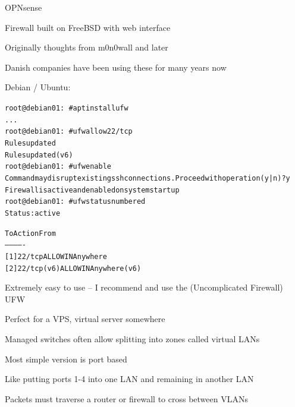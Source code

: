 \documentclass[Screen16to9,17pt]{foils}
\begin{document}


\begin{list2}
\item OPNsense 
\item Firewall built on FreeBSD with web interface
\item Originally thoughts from m0n0wall and later \\
\item Danish companies have been using these for many years now
\end{list2}



Debian / Ubuntu:
\begin{alltt}\scriptsize
root@debian01:~# apt install ufw
...
root@debian01:~# ufw allow 22/tcp
Rules updated
Rules updated (v6)
root@debian01:~# ufw enable
Command may disrupt existing ssh connections. Proceed with operation (y|n)? y
Firewall is active and enabled on system startup
root@debian01:~# ufw status numbered
Status: active

     To                         Action      From
     --                         ------      ----
[ 1] 22/tcp                     ALLOW IN    Anywhere
[ 2] 22/tcp (v6)                ALLOW IN    Anywhere (v6)
\end{alltt}

\begin{list2}
\item Extremely easy to use -- I recommend and use the (Uncomplicated Firewall) UFW
\item Perfect for a VPS, virtual server somewhere
\end{list2}




\begin{list1}
\item Managed switches often allow splitting into zones called virtual LANs
\item Most simple version is port based
\item Like putting ports 1-4 into one LAN and remaining in another LAN
\item Packets must traverse a router or firewall to cross between VLANs
\end{list1}
\end{document}
